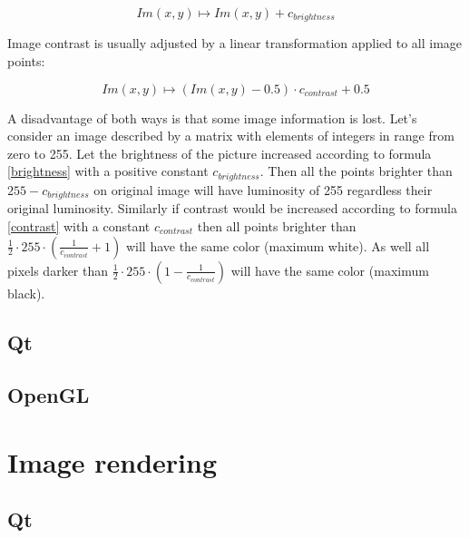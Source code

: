 \begin{equation}
\label{brightness}
  Im(x,y) \longmapsto Im(x,y) + c_{brightness} 
\end{equation}

Image contrast is usually adjusted by a linear transformation applied to all image points:

\begin{equation}
\label{contrast}
  Im(x,y) \longmapsto   (Im(x,y) - 0.5) \cdot c_{contrast} + 0.5
\end{equation}

A disadvantage of both ways is that some image information is lost. Let's consider an image described by a matrix with elements of integers in range from zero to 255. Let the brightness of the picture increased according to formula \eqref{brightness} with a positive constant $ c_{brightness} $. Then all the points brighter than $ 255 - c_{brightness} $ on original image will have luminosity of 255 regardless their original luminosity. Similarly if contrast would be increased according to formula \eqref{contrast} with a constant $ c_{contrast} $ then all points brighter than $ \frac{1}{2} \cdot 255 \cdot (\frac{1}{c_{contrast}}+1) $ will have the same color (maximum white). As well all pixels darker than $ \frac{1}{2} \cdot 255 \cdot (1 - \frac{1}{c_{contrast}}) $ will have the same color (maximum black).

\subsection*{Qt}


\subsection*{OpenGL}


\section*{Image rendering}

\subsection*{Qt}

